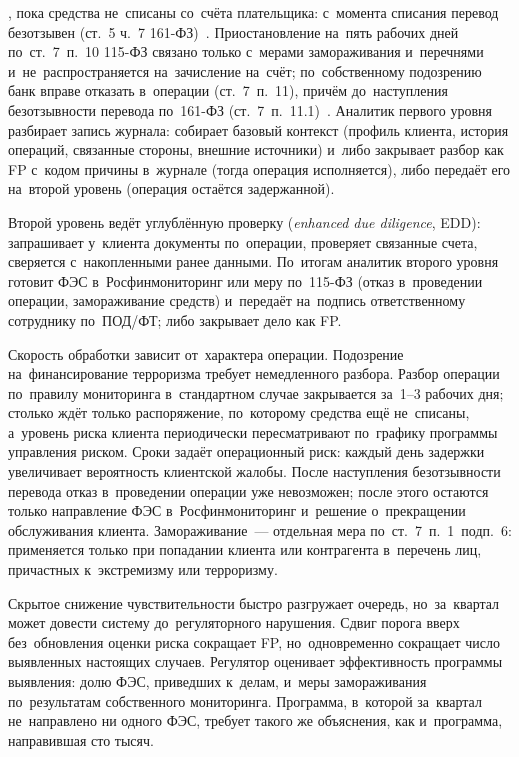 ,
пока средства не~списаны со~счёта плательщика: с~момента списания перевод
безотзывен (ст.~5 ч.~7 161-ФЗ)~\cite{fz-161}.
Приостановление на~пять рабочих дней по~ст.~7~п.~10 115-ФЗ связано только
с~мерами замораживания и~перечнями и~не~распространяется на~зачисление
на~счёт; по~собственному подозрению банк вправе отказать в~операции
(ст.~7~п.~11), причём до~наступления безотзывности перевода по~161-ФЗ
(ст.~7~п.~11.1)~\cite{fz-115}.
Аналитик первого уровня разбирает запись журнала: собирает базовый контекст
(профиль клиента, история операций, связанные стороны, внешние источники)
и~либо закрывает разбор как FP с~кодом причины в~журнале (тогда операция
исполняется), либо передаёт его на~второй уровень (операция остаётся
задержанной).

Второй уровень ведёт углублённую проверку (\textit{enhanced due diligence},
EDD): запрашивает у~клиента документы
по~операции, проверяет связанные счета, сверяется с~накопленными ранее данными.
По~итогам аналитик второго уровня готовит ФЭС в~Росфинмониторинг или меру
по~115-ФЗ (отказ в~проведении операции, замораживание средств) и~передаёт
на~подпись ответственному сотруднику по~ПОД/ФТ; либо закрывает дело как FP.

Скорость обработки зависит от~характера операции. Подозрение на~финансирование
терроризма требует немедленного разбора. Разбор операции по~правилу
мониторинга в~стандартном случае закрывается за~1--3 рабочих дня;
столько ждёт только распоряжение, по~которому средства ещё не~списаны,
а~уровень
риска клиента периодически пересматривают по~графику программы управления риском. Сроки задаёт
операционный риск: каждый день задержки увеличивает вероятность клиентской
жалобы. После наступления безотзывности перевода
отказ в~проведении операции уже невозможен; после этого остаются только направление
ФЭС в~Росфинмониторинг и~решение о~прекращении обслуживания клиента.
Замораживание~--- отдельная мера по~ст.~7~п.~1~подп.~6: применяется
только при попадании клиента или контрагента в~перечень лиц,
причастных к~экстремизму или терроризму.

Скрытое снижение чувствительности быстро разгружает очередь, но~за~квартал
может довести систему до~регуляторного нарушения. Сдвиг порога вверх
без~обновления оценки риска сокращает FP, но~одновременно сокращает
число выявленных настоящих случаев. Регулятор
оценивает эффективность программы выявления: долю ФЭС, приведших к~делам,
и~меры замораживания по~результатам собственного мониторинга. Программа,
в~которой за~квартал не~направлено ни одного ФЭС, требует такого же объяснения,
как и~программа, направившая сто тысяч.

